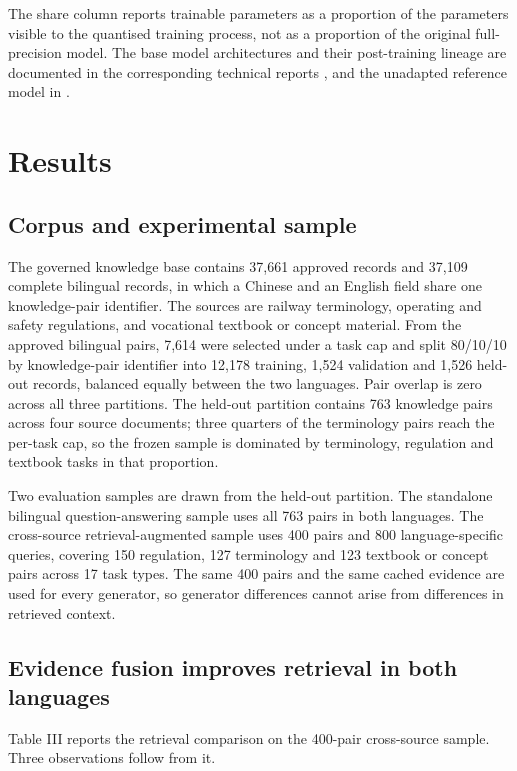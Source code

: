 \documentclass{article}
\begin{document}
The share column reports trainable parameters as a proportion of the parameters visible to the quantised training process, not as a proportion of the original full-precision model. The base model architectures and their post-training lineage are documented in the corresponding technical reports \citep{qwen2024technical,glm2024chatglm}, and the unadapted reference model in \citep{qwen2025technical}.

\section{Results}

\subsection{Corpus and experimental sample}

The governed knowledge base contains 37,661 approved records and 37,109 complete bilingual records, in which a Chinese and an English field share one knowledge-pair identifier. The sources are railway terminology, operating and safety regulations, and vocational textbook or concept material. From the approved bilingual pairs, 7,614 were selected under a task cap and split 80/10/10 by knowledge-pair identifier into 12,178 training, 1,524 validation and 1,526 held-out records, balanced equally between the two languages. Pair overlap is zero across all three partitions. The held-out partition contains 763 knowledge pairs across four source documents; three quarters of the terminology pairs reach the per-task cap, so the frozen sample is dominated by terminology, regulation and textbook tasks in that proportion.

Two evaluation samples are drawn from the held-out partition. The standalone bilingual question-answering sample uses all 763 pairs in both languages. The cross-source retrieval-augmented sample uses 400 pairs and 800 language-specific queries, covering 150 regulation, 127 terminology and 123 textbook or concept pairs across 17 task types. The same 400 pairs and the same cached evidence are used for every generator, so generator differences cannot arise from differences in retrieved context.

\subsection{Evidence fusion improves retrieval in both languages}

Table III reports the retrieval comparison on the 400-pair cross-source sample. Three observations follow from it.
\end{document}
